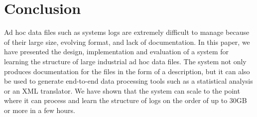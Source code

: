 \documentclass{vldb}
\begin{document}
% 






\maketitle















\section{Conclusion}
\label{sec:conclude}
Ad hoc data files such as systems logs 
are extremely difficult to manage because of their large size,
evolving format, and lack of documentation.
In this paper, we have presented the design, implementation and
evaluation of a system for learning the structure of 
large industrial ad hoc data files.  The system not only
produces documentation for the files in the form of a \pads{}
description, but it can also be used to generate end-to-end
data processing tools such as a statistical analysis or an
XML translator.  We have shown that the system
can scale to the point where it can process and learn the
structure of logs on the order of up to 30GB or more in 
a few hours.



\newpage
\appendix

\end{document}
